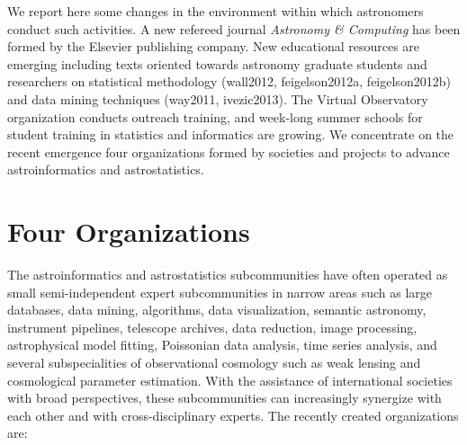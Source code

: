 We report here some changes in the environment within which astronomers conduct such activities.  A new refereed journal {\it Astronomy \& Computing} has been formed by the Elsevier publishing company.  New educational resources are emerging including texts oriented towards astronomy graduate students and researchers on statistical methodology (wall2012, feigelson2012a, feigelson2012b) and data mining techniques (way2011, ivezic2013).  The Virtual Observatory organization conducts outreach training, and week-long summer schools for student training in statistics and informatics are growing.   We concentrate on the recent emergence four organizations formed by societies and projects to advance astroinformatics and astrostatistics.  

\section{Four Organizations}

The astroinformatics and astrostatistics subcommunities have often operated as small semi-independent expert subcommunities in narrow areas such as large databases, data mining, algorithms, data visualization, semantic astronomy, instrument pipelines, telescope archives, data reduction, image processing, astrophysical model fitting, Poissonian data analysis, time series analysis, and several subspecialities of observational cosmology such as weak lensing and cosmological parameter estimation.  With the assistance of international societies with broad perspectives, these subcommunities can increasingly synergize with each other and with cross-disciplinary experts.   The recently created organizations are:

